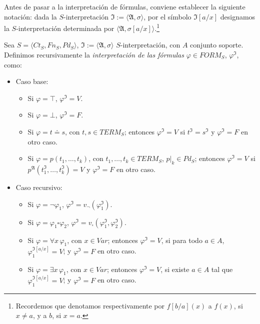 Antes de pasar a la interpretación de fórmulas, conviene establecer la siguiente notación: dada la $S$-interpretación $\mathfrak{I} := \langle \mathfrak{A}, \sigma \rangle$, por el símbolo $\mathfrak{I}[a/x]$ designamos la $S$-interpretación determinada por $\langle \mathfrak{A}, \sigma[a/x]\rangle$.\footnote{Recordemos que denotamos respectivamente por $f[b/a](x)$ a $f(x)$, si $x \neq a$, y a $b$, si $x = a$.}

\begin{definition}
Sea $S = \langle Ct_{S}, Fn_{S}, Pd_{S}\rangle$, $\mathfrak{I} := \langle \mathfrak{A}, \sigma \rangle$ $S$-interpretación, con $A$ conjunto soporte.  Definimos recursivamente la \textit{interpretación de las fórmulas} $\varphi \in FORM_S$, $\varphi^{\mathfrak{I}}$, como:
\begin{itemize}
    \item Caso base:
        \begin{itemize}
            \item Si $\varphi = \top$, $\varphi^{\mathfrak{I}} = V$.
            \item Si $\varphi = \bot$, $\varphi^{\mathfrak{I}} = F$.
            \item Si $\varphi = t \doteq s$, con $t, s \in TERM_S$; entonces $\varphi^{\mathfrak{I}} = V$ si $t^{\mathfrak{I}} = s^{\mathfrak{I}}$ y $\varphi^{\mathfrak{I}} = F$ en otro caso.
            \item Si $\varphi = p(t_1, \dots, t_k)$, con $t_1, \dots, t_k \in TERM_S$, $p|_k \in Pd_S$; entonces $\varphi^{\mathfrak{I}} = V$ si $p^{\mathfrak{A}}(t_{1}^{\mathfrak{I}}, \dots, t_{k}^{\mathfrak{I}}) = V$ y $\varphi^{\mathfrak{I}} = F$ en otro caso. 
        \end{itemize}
    \item Caso recursivo:
        \begin{itemize}
            \item Si $\varphi = \neg \varphi_1$,  $\varphi^{\mathfrak{I}} = v_{\neg}(\varphi_{1}^{\mathfrak{I}})$.
            \item Si $\varphi = \varphi_1 \square \varphi_2$,  $\varphi^{\mathfrak{I}} = v_{\square}(\varphi_{1}^{\mathfrak{I}}, \varphi_{2}^{\mathfrak{I}})$.
            \item Si $\varphi = \forall x \, \varphi_1$, con $x \in Var$; entonces $\varphi^{\mathfrak{I}} = V$, si para todo $a \in A$, $\varphi_1^{\mathfrak{I}[a/x]} = V$; y $\varphi^{\mathfrak{I}} = F$ en otro caso.
            \item Si $\varphi = \exists x \, \varphi_1$, con $x \in Var$; entonces $\varphi^{\mathfrak{I}} = V$, si existe $a \in A$ tal que $\varphi_1^{\mathfrak{I}[a/x]} = V$; y $\varphi^{\mathfrak{I}} = F$ en otro caso.
        \end{itemize}
\end{itemize}
\end{definition}

